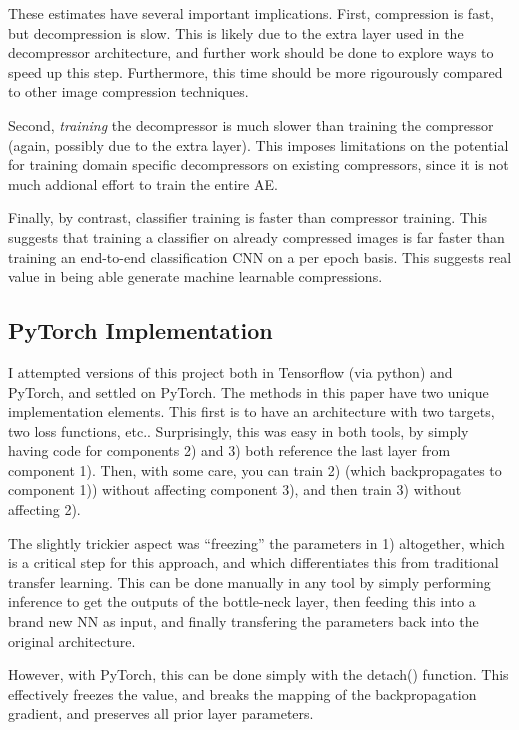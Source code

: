 \documentclass[twoside,11pt]{article}
\begin{document}
These estimates have several important implications. First, compression is fast,
but decompression is slow. This is likely due to the extra layer used in the 
decompressor architecture, and further work should be done to explore ways to speed up this step.
Furthermore, this time should be more rigourously compared to other image compression techniques.

Second, \emph{training} the decompressor is much slower than training the
compressor (again, possibly due to the extra layer).
This imposes limitations on the potential for training domain specific decompressors on 
existing compressors, since it is not much addional effort to train the entire AE.

Finally, by contrast, classifier training is faster than compressor training.
This suggests that training a classifier on already compressed images is far faster 
than training an end-to-end classification CNN on a per epoch basis. This suggests real 
value in being able generate machine learnable compressions.  

\subsection{PyTorch Implementation}

I attempted versions of this project both in Tensorflow (via python) and PyTorch, 
and settled on PyTorch.
The methods in this paper have two unique implementation elements.
This first is to have an architecture
with two targets, two loss functions, etc.. Surprisingly, this was easy in both tools, by
simply having code for components 2) and 3) both reference the last layer from component 1).
Then, with some care, you can train 2) (which backpropagates to component 1)) without 
affecting component 3), and then train 3) without affecting 2).

The slightly trickier aspect was ``freezing'' the parameters in 1) altogether, 
which is a critical step for this approach, and which differentiates this from traditional
transfer learning. This can be done manually in any tool by simply performing inference
to get the outputs of the bottle-neck layer, then feeding this into a brand new NN as input,
and finally transfering the parameters back into the original architecture.

However, with PyTorch, this can be done simply with the detach() function.
This effectively freezes the value, and breaks the mapping of the backpropagation gradient, 
and preserves all prior layer parameters.
\end{document}
